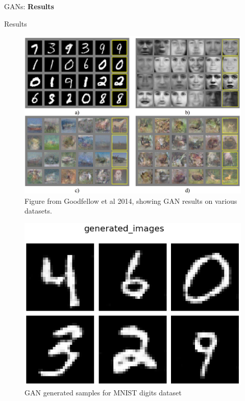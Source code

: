 \begin{frame}{}
    \LARGE GANs: \textbf{Results}
\end{frame}

\begin{frame}[allowframebreaks]{Results}
\begin{figure}
    \centering
    \includegraphics[height=0.8\textheight, width=\textwidth, keepaspectratio]{images/gan/result-goodfellow.png}
    \caption*{Figure from Goodfellow et al 2014, showing GAN results on various datasets.}
\end{figure}

\framebreak
\begin{figure}
    \centering
    \includegraphics[height=0.8\textheight, width=\textwidth, keepaspectratio]{images/gan/gan_results_mnist.png}
    \caption*{GAN generated samples for MNIST digits dataset}
\end{figure}


\end{frame}
